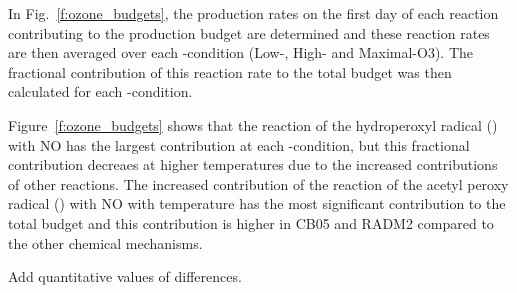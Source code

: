 In Fig.~\ref{f:ozone_budgets}, the production rates on the first day of each reaction contributing to the  production budget are determined and these reaction rates are then averaged over each -condition (Low-, High- and Maximal-O3).
The fractional contribution of this reaction rate to the total  budget was then calculated for each -condition.

Figure~\ref{f:ozone_budgets} shows that the reaction of the hydroperoxyl radical () with NO has the largest contribution at each -condition, but this fractional contribution decreaes at higher temperatures due to the increased contributions of other reactions.
The increased contribution of the reaction of the acetyl peroxy radical () with NO with temperature has the most significant contribution to the total  budget and this contribution is higher in CB05 and RADM2 compared to the other chemical mechanisms.

Add quantitative values of differences.

%
%
%    
%
%
